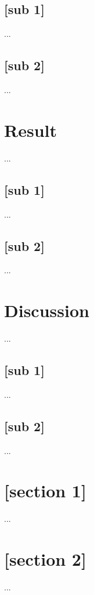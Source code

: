\documentclass{article}
\begin{document}
\subsection{[sub 1]}\label{subsec:M_1}
...


\subsection{[sub 2]}\label{subsec:M_2}
...


\section{Result}\label{sec:Result}
...


\subsection{[sub 1]}\label{subsec:R_1}
...


\subsection{[sub 2]}\label{subsec:R_2}
...


\section{Discussion}\label{sec:Discussion}
...


\subsection{[sub 1]}\label{subsec:D_1}
...


\subsection{[sub 2]}\label{subsec:d_2}
...


\newpage
\printbibliography


\newpage
\appendix

\section{[section 1]}\label{app:a}
...


\section{[section 2]}\label{app:b}
...


\end{document}
